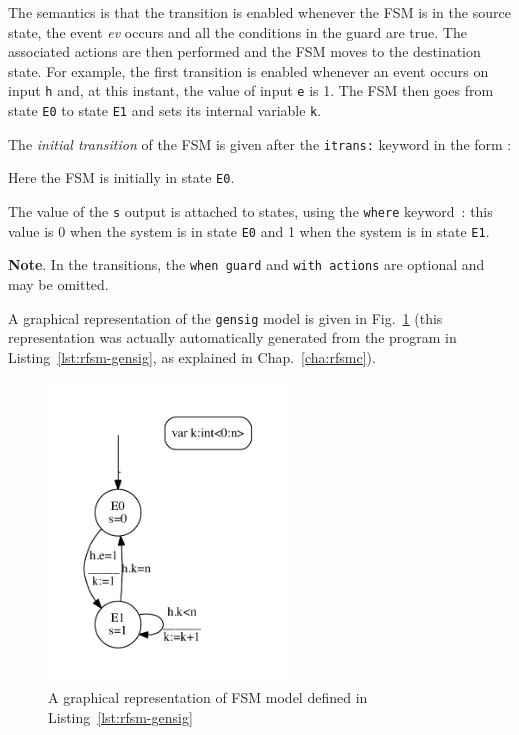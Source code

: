 The semantics is that the transition is enabled
whenever the FSM is in the source state, the event \emph{ev} occurs and all the conditions in the
guard are true. The associated actions
are then performed and the FSM moves to the destination state. For example, the first transition is
enabled whenever an event occurs on input \verb|h| and, at this instant, the value of input \verb|e|
is 1. The FSM then goes from state \verb|E0| to state \verb|E1| and sets its internal variable 
\verb|k|.
   
The \emph{initial transition} of the FSM is given 
after the \verb|itrans:| keyword in the form :
\begin{center}
\end{center}
Here the FSM is initially in state \verb|E0|.

The value of the \texttt{s} output is attached to states, using
the \lstinline[language=Rfsm]{where} keyword~: this value is 0 when the
system is in state \texttt{E0} and 1 when the system is in state \texttt{E1}.

\textbf{Note}. In the transitions, the \lstinline[language=Rfsm]{when guard} and
\lstinline[language=Rfsm]{with actions} are optional and may be omitted.

A graphical representation of the \verb|gensig| model is given in
Fig.~\ref{fig:rfsm-gensig-model} (this representation was actually automatically generated from the
program in Listing~\ref{lst:rfsm-gensig}, as explained in Chap.~\ref{cha:rfsmc}). 

\begin{figure}[!h]
   \includegraphics[height=8cm]{figs/gensig-model}
   \centering
  \caption{A graphical representation of FSM model defined in Listing~\ref{lst:rfsm-gensig}}
  \label{fig:rfsm-gensig-model}
\end{figure}

